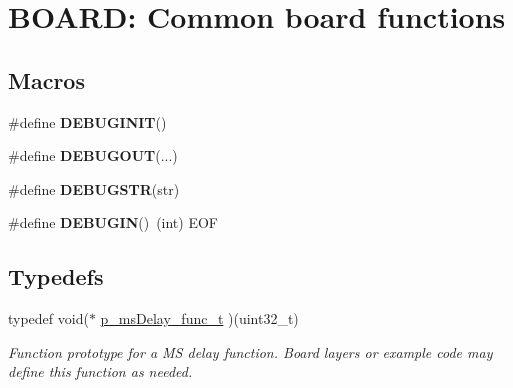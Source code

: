 \hypertarget{group___b_o_a_r_d___c_o_m_m_o_n___a_p_i}{\section{B\+O\+A\+R\+D\+: Common board functions}
\label{group___b_o_a_r_d___c_o_m_m_o_n___a_p_i}
}
\subsection*{Macros}
\begin{DoxyCompactItemize}
\item 
\hypertarget{group___b_o_a_r_d___c_o_m_m_o_n___a_p_i_ga5f3d8b382683793eb0b2723083f518f8}{\#define {\bfseries D\+E\+B\+U\+G\+I\+N\+I\+T}()}\label{group___b_o_a_r_d___c_o_m_m_o_n___a_p_i_ga5f3d8b382683793eb0b2723083f518f8}

\item 
\hypertarget{group___b_o_a_r_d___c_o_m_m_o_n___a_p_i_gacf358ee75cab3e9eb271e46bf983aaff}{\#define {\bfseries D\+E\+B\+U\+G\+O\+U\+T}(...)}\label{group___b_o_a_r_d___c_o_m_m_o_n___a_p_i_gacf358ee75cab3e9eb271e46bf983aaff}

\item 
\hypertarget{group___b_o_a_r_d___c_o_m_m_o_n___a_p_i_gaf1817cfaa7fbfb1c32ba55fa0d792d0b}{\#define {\bfseries D\+E\+B\+U\+G\+S\+T\+R}(str)}\label{group___b_o_a_r_d___c_o_m_m_o_n___a_p_i_gaf1817cfaa7fbfb1c32ba55fa0d792d0b}

\item 
\hypertarget{group___b_o_a_r_d___c_o_m_m_o_n___a_p_i_gad87de76956f23e36f51356aaed5c18e4}{\#define {\bfseries D\+E\+B\+U\+G\+I\+N}()~(int) E\+O\+F}\label{group___b_o_a_r_d___c_o_m_m_o_n___a_p_i_gad87de76956f23e36f51356aaed5c18e4}

\end{DoxyCompactItemize}
\subsection*{Typedefs}
\begin{DoxyCompactItemize}
\item 
\hypertarget{group___b_o_a_r_d___c_o_m_m_o_n___a_p_i_gabd040b6a5eb9bbf2697cbe943b8ecbc8}{typedef void($\ast$ \hyperlink{group___b_o_a_r_d___c_o_m_m_o_n___a_p_i_gabd040b6a5eb9bbf2697cbe943b8ecbc8}{p\+\_\+ms\+Delay\+\_\+func\+\_\+t} )(uint32\+\_\+t)}\label{group___b_o_a_r_d___c_o_m_m_o_n___a_p_i_gabd040b6a5eb9bbf2697cbe943b8ecbc8}

\begin{DoxyCompactList}\small\item\em Function prototype for a M\+S delay function. Board layers or example code may define this function as needed. \end{DoxyCompactList}\end{DoxyCompactItemize}
